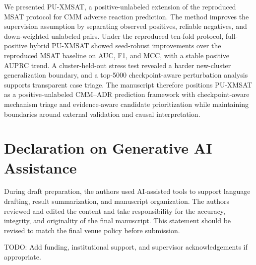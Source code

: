 \documentclass[manuscript,screen,review]{acmart}
\newcommand{\msat}{MSAT}
\newcommand{\px}{PU-XMSAT}
\begin{document}
We presented \px{}, a positive-unlabeled extension of the reproduced \msat{} protocol for CMM adverse reaction prediction. The method improves the supervision assumption by separating observed positives, reliable negatives, and down-weighted unlabeled pairs. Under the reproduced ten-fold protocol, full-positive hybrid \px{} showed seed-robust improvements over the reproduced \msat{} baseline on AUC, F1, and MCC, with a stable positive AUPRC trend. A cluster-held-out stress test revealed a harder new-cluster generalization boundary, and a top-5000 checkpoint-aware perturbation analysis supports transparent case triage. The manuscript therefore positions \px{} as a positive-unlabeled CMM--ADR prediction framework with checkpoint-aware mechanism triage and evidence-aware candidate prioritization while maintaining boundaries around external validation and causal interpretation.

\section*{Declaration on Generative AI Assistance}

During draft preparation, the authors used AI-assisted tools to support language drafting, result summarization, and manuscript organization. The authors reviewed and edited the content and take responsibility for the accuracy, integrity, and originality of the final manuscript. This statement should be revised to match the final venue policy before submission.

\begin{acks}
TODO: Add funding, institutional support, and supervisor acknowledgements if appropriate.
\end{acks}



\end{document}
